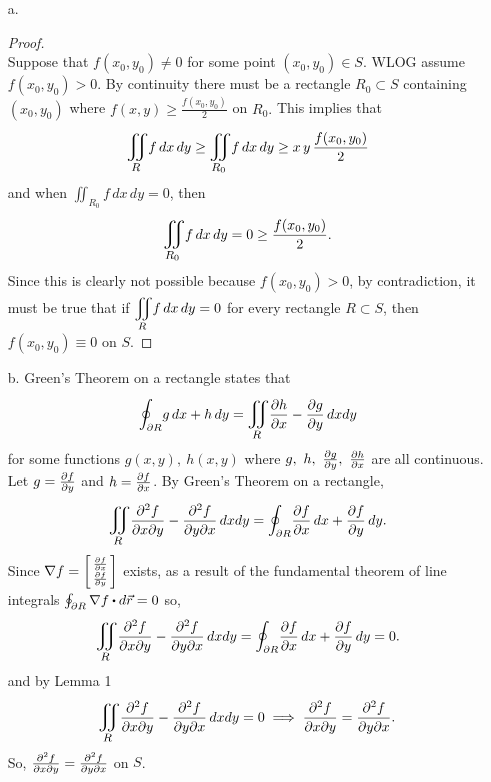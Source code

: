 \documentclass[titlepage]{article}
\begin{document}
\begin{solution}
\vspace{-2em}
\begin{itemize}
\item[a.] \ \\ \vspace{-2em}\begin{proof}\ \\Suppose that $f(x_0, y_0) \neq 0$ for some point $(x_0,y_0) \in S.$ WLOG assume $f(x_0,y_0) > 0$. By continuity there must be a rectangle $R_0 \subset S$ containing $(x_0,y_0)$ where $f(x,y) \geq \frac{f(x_0,y_0)}{2}$ on $R_0.$ This implies that 
$$\bigiint{R}{} f\,dx\,dy \geq \bigiint{R_0}{}f\,dx\,dy \geq x\,y\,\frac{f(x_0,y_0)}{2}$$
and when $\iint_{R_0}f\,dx\,dy = 0$, then
$$\bigiint{R_0}{}f\,dx\,dy = 0 \geq \frac{f(x_0,y_0)}{2}.$$
Since this is clearly not possible because $f(x_0,y_0) > 0$, by contradiction, it must be true that if $\bigiint{R}{}f\,dx\,dy = 0$ for every rectangle $R \subset S$, then $f(x_0,y_0) \equiv 0$ on $S$.
\end{proof}
\item[b.] Green's Theorem on a rectangle states that 
$$  \mathlarger\oint_{\p R} g\,dx + h\,dy = \bigiint{R}{}\frac{\p h}{\p x} - \frac{\p g}{ \p y}\,dx dy $$
for some functions $g(x,y), \ h(x,y)$ where $g, \ h, \ \frac{\partial g}{\partial y}, \ \frac{\partial h}{\partial x}$ are all continuous. Let $g = \frac{\partial f}{\partial y}$ and $h = \frac{\partial f}{\partial x}$. By Green's Theorem on a rectangle,
$$ \bigiint{R}{}\frac{\p^2 f}{\p x \p y} - \frac{\p^2 f}{ \p y \p x}\,dx dy =  \mathlarger\oint_{\p R} \frac{\p f}{\p x}\,dx + \frac{\p f}{\p y}\,dy.$$
Since $\nabla f = \left[\begin{smallmatrix}\frac{\partial f}{\partial x} \\ \frac{\partial f}{\partial y}\end{smallmatrix}\right]$ exists, as a result of the fundamental theorem of line integrals $\oint_{\p R} \nabla f \bigcdot d\vec{r} = 0$ so, 
$$ \bigiint{R}{}\frac{\p^2 f}{\p x \p y} - \frac{\p^2 f}{ \p y \p x}\,dx dy =  \mathlarger\oint_{\p R} \frac{\p f}{\p x}\,dx + \frac{\p f}{\p y}\,dy = 0.$$
and by Lemma 1
$$ \bigiint{R}{}\frac{\p^2 f}{\p x \p y} - \frac{\p^2 f}{ \p y \p x}\,dx dy = 0 \implies  \frac{\p^2 f}{\p x \p y} = \frac{\p^2 f}{ \p y \p x}.$$
So, $\frac{\partial^2 f}{\partial x \partial y} = \frac{\partial^2 f}{ \partial y \partial x}$ on $S$.
\end{itemize}
\end{solution}
\end{document}
